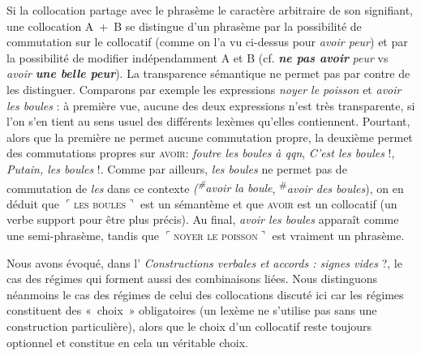 Si la collocation partage avec le phrasème le caractère arbitraire de son signifiant, une collocation A~+~B se distingue d’un phrasème par la possibilité de commutation sur le collocatif (comme on l’a vu ci-dessus pour \textit{avoir peur}) et par la possibilité de modifier indépendamment A et B (cf. \textbf{\textit{ne pas avoir}} \textit{peur} vs \textit{avoir} \textbf{\textit{une belle peur}}). La transparence sémantique ne permet pas par contre de les distinguer. Comparons par exemple les expressions \textit{noyer le poisson} et \textit{avoir les boules} : à première vue, aucune des deux expressions n’est très transparente, si l’on s’en tient au sens usuel des différents lexèmes qu’elles contiennent. Pourtant, alors que la première ne permet aucune commutation propre, la deuxième permet des commutations propres sur \textsc{avoir}: \textit{foutre les boules à qqn}, \textit{C’est les boules} !, \textit{Putain, les boules} !. Comme par ailleurs, \textit{les boules} ne permet pas de commutation de \textit{les} dans ce contexte \textit{(\textsuperscript{\#}}\textit{avoir la boule}, \textsuperscript{\#}\textit{avoir des boules}), on en déduit que $⌜$\textsc{les} \textsc{boules}$⌝$ est un sémantème et que \textsc{avoir} est un collocatif (un verbe support pour être plus précis). Au final, \textit{avoir les boules} apparaît comme une semi-phrasème, tandis que $⌜$\textsc{noyer} \textsc{le} \textsc{poisson}$⌝$ est vraiment un phrasème.

Nous avons évoqué, dans l’ \textit{Constructions verbales et accords : signes vides} ?, le cas des régimes qui forment aussi des combinaisons liées. Nous distinguons néanmoins le cas des régimes de celui des collocations discuté ici car les régimes constituent des «~choix~» obligatoires (un lexème ne s’utilise pas sans une construction particulière), alors que le choix d’un collocatif reste toujours optionnel et constitue en cela un véritable choix.

